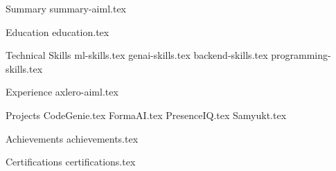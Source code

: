 \documentclass{cv_template}
\begin{document}
\begin{fitpage}

    \makecvheader

    \begin{cvsection}{Summary}
        {summary-aiml.tex}
    \end{cvsection}

    \begin{cvsection}{Education}
        {education.tex}
    \end{cvsection}

    \begin{cvsection}{Technical Skills}
        {ml-skills.tex}
        {genai-skills.tex}
        {backend-skills.tex}
        {programming-skills.tex}
    \end{cvsection}

    \begin{cvsection}{Experience}
        {axlero-aiml.tex}
    \end{cvsection}

    \begin{cvsection}{Projects}
        {CodeGenie.tex}
        {FormaAI.tex}
        {PresenceIQ.tex}
        {Samyukt.tex}
    \end{cvsection}

    \begin{cvsection}{Achievements}
        {achievements.tex}
    \end{cvsection}

    \begin{cvsection}{Certifications}
        {certifications.tex}
    \end{cvsection}

\end{fitpage}
\end{document}

